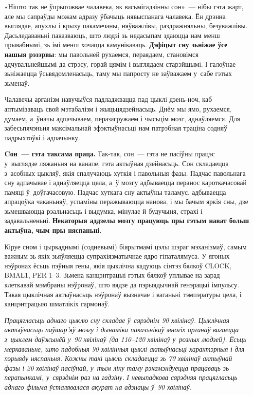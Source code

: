 
«Нішто так не ўпрыгожвае чалавека, як васьмігадзінны сон»~--- нібы гэта жарт, але мы сапраўды можам адразу ўбачыць нявыспанага чалавека. Ён дрэнна выглядае, апухлы і крыху пакамечаны, няўважлівы, раздражняльны, безуважлівы. Дасьледаваньні паказваюць, што людзі зь недасыпам здаюцца нам менш прывабнымі, зь імі менш хочацца камунікаваць. \textbf{Дэфіцыт сну зьніжае ўсе нашыя рэзэрвы}: мы павольней рухаемся, пераядаем, становімся адчувальнейшымі да стрэсу, горай цямім і выглядаем старэйшымі. І галоўнае~--- зьніжаецца ўсьвядомленасьць, таму мы папросту не заўважаем у~сабе гэтых зьменаў.

Чалавечы арганізм навучыўся падладжвацца пад цыклі дзень-ноч, каб аптымізаваць свой мэтабалізм і жыцьцядзейнасьць. Днём мы ямо, рухаемся, думаем, а~ўначы адпачываем, перазагружаем і чысьцім мозг, аднаўляемся. Для забесьпячэньня максімальнай эфэктыўнасьці нам патрэбная траціна содняў падрыхтоўкі і адпачынку.

\textbf{Cон~--- гэта таксама праца.} Так-так, сон~--- гэта не пасіўны працэс у~выглядзе ляжаньня на канапе, гэта актыўная дзейнасьць. Сон складаецца з~асобных цыкляў, якія спалучаюць хуткія і павольныя фазы. Падчас павольнага сну адпачывае і аднаўляецца цела, а~ў мозгу адбываецца перанос кароткачасовай памяці ў~доўгачасовую. Падчас хуткага сну актыўны таламус, адбываецца апрацоўка чаканьняў, успаміны перажываюцца нанова, і мы бачым яркія сны, дзе зьмешваюцца рэальнасьць і выдумка, мінулае й будучыня, страхі і задавальненьні. \textbf{Некаторыя аддзелы мозгу працуюць пры гэтым нават больш актыўна, чым пры няспаньні.}

Кіруе сном і цыркаднымі (содневымі) біярытмамі цэлы шэраг мэханізмаў, самым важным зь якіх зьяўляецца супрахіязматычнае ядро гіпаталямуса. У ягоных нэўронах ёсьць пэўныя гены, якія цыклічна кадуюць сінтэз бялкоў CLOCK, BMAL1, PER 1--3. Зьмена канцэнтрацыі гэтых бялкоў уплывае на зарад клеткавай мэмбраны нэўронаў, што вядзе да пэрыядычнай генэрацыі імпульсу. Такая цыклічная актыўнасьць нэўронаў вызначае і ваганьні тэмпэратуры цела, і канцэнтрацыю шматлікіх гармонаў.

\emph{Працягласьць аднаго цыклю сну складае ў~сярэднім 90 хвілінаў. Цыклічная актыўнасьць паўшар'яў мозгу і дынаміка паказьнікаў многіх органаў вагаецца з~цыклем даўжынёй у~90 хвілінаў (да 110--120 хвілінаў у~розных людзей). Ёсьць меркаваньне, што падобныя 90-хвілінныя цыклі актыўнасьці характэрныя і для пэрыяду няспаньня. Кожны такі цыкль складаецца зь 70 хвілінаў актыўнай фазы і 20 хвілінаў пасіўнай, у~тым ліку таму рэкамэндуецца працаваць зь перапынкамі, у~сярэднім раз на гадзіну. І невыпадкова сярэдняя працягласьць аднаго фільма ўсталявалася акурат на адзнацы ў~90 хвілінаў.}

